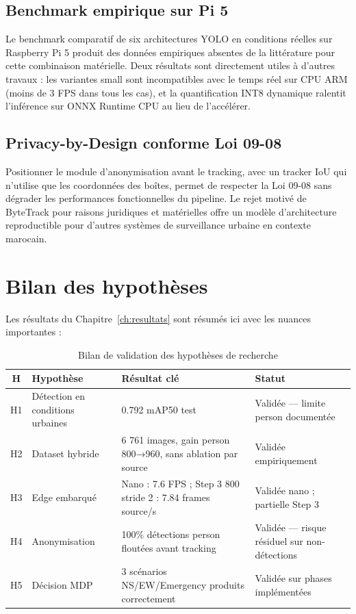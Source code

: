 \subsection{Benchmark empirique sur Pi 5}

Le benchmark comparatif de six
architectures YOLO en conditions
réelles sur Raspberry Pi 5 produit
des données empiriques absentes de
la littérature pour cette combinaison
matérielle. Deux résultats sont
directement utiles à d'autres travaux :
les variantes small sont incompatibles
avec le temps réel sur CPU ARM (moins
de 3 FPS dans tous les cas), et la
quantification INT8 dynamique ralentit
l'inférence sur ONNX Runtime CPU au
lieu de l'accélérer.

\subsection{Privacy-by-Design conforme
            Loi 09-08}

Positionner le module d'anonymisation
avant le tracking, avec un tracker IoU
qui n'utilise que les coordonnées des
boîtes, permet de respecter la Loi 09-08
sans dégrader les performances
fonctionnelles du pipeline. Le rejet
motivé de ByteTrack pour raisons
juridiques et matérielles offre un
modèle d'architecture reproductible
pour d'autres systèmes de surveillance
urbaine en contexte marocain.

\section{Bilan des hypothèses}

Les résultats du Chapitre~\ref{ch:resultats}
sont résumés ici avec les nuances
importantes :

\begin{table}[H]
\centering
\caption{Bilan de validation des
         hypothèses de recherche}
\small
\begin{tabularx}{\textwidth}{cXXX}
\toprule
\textbf{H} &
\textbf{Hypothèse} &
\textbf{Résultat clé} &
\textbf{Statut} \\
\midrule
H1 &
Détection en conditions urbaines &
0.792 mAP50 test &
Validée — limite person
documentée \\
H2 &
Dataset hybride &
6 761 images, gain person
800→960, sans ablation
par source &
Validée empiriquement \\
H3 &
Edge embarqué &
Nano : 7.6 FPS ;
Step 3 800 stride 2 :
7.84 frames source/s &
Validée nano ;
partielle Step 3 \\
H4 &
Anonymisation &
100\% détections person
floutées avant tracking &
Validée — risque résiduel
sur non-détections \\
H5 &
Décision MDP &
3 scénarios NS/EW/Emergency
produits correctement &
Validée sur phases
implémentées \\
\bottomrule
\end{tabularx}
\label{tab:hypotheses_bilan_ch6}
\end{table}

